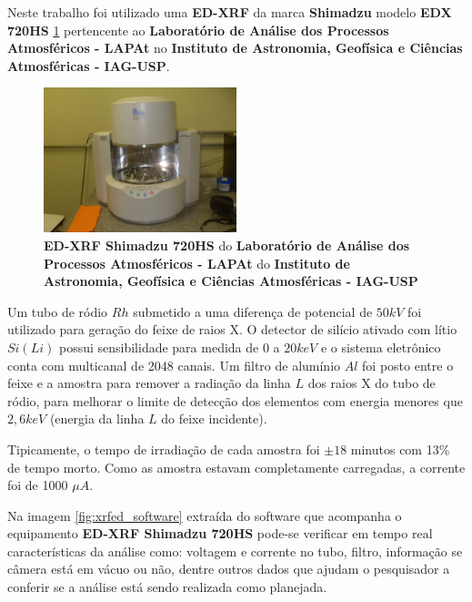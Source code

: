 
Neste trabalho foi utilizado uma \textbf{ED-XRF} da marca \textbf{Shimadzu} 
modelo \textbf{EDX 720HS} \ref{fig:xrfed_iag} pertencente ao 
\textbf{Laboratório de Análise dos Processos Atmosféricos - LAPAt}
no \textbf{Instituto de Astronomia, Geofísica e Ciências Atmosféricas - IAG-USP}.

\begin{figure}[H]
\begin{center}
  \includegraphics[width=0.5\textwidth]{../inputs/images/xrf-ed-IAG-USP.jpg}
  \caption{\textbf{ED-XRF Shimadzu 720HS} do \textbf{Laboratório de Análise dos Processos Atmosféricos - LAPAt} do
           \textbf{Instituto de Astronomia, Geofísica e Ciências Atmosféricas - IAG-USP} \label{fig:xrfed_iag}}
\end{center}
\end{figure}

Um tubo de ródio $Rh$ submetido a uma diferença de potencial 
de $50 kV$ foi utilizado para geração do feixe de raios X.
O detector de silício ativado com lítio $Si(Li)$ possui sensibilidade
para medida de $0$ a $20 keV$ e o sistema eletrônico conta com multicanal 
de 2048 canais.
Um filtro de alumínio $Al$ foi posto entre o feixe e a amostra para remover
a radiação da linha $L$ dos raios X do tubo de ródio, para melhorar o limite
de detecção dos elementos com energia menores que $2,6 keV$ (energia da linha
$L$ do feixe incidente).

Tipicamente, o tempo de irradiação de cada amostra foi $\pm 18$ minutos com 
13\% de tempo morto. Como as amostra estavam completamente carregadas, 
a corrente foi de 1000 $\mu A$. 

Na imagem \ref{fig:xrfed_software} extraída do software que acompanha o equipamento
\textbf{ED-XRF Shimadzu 720HS} pode-se verificar em tempo real características da
análise como: voltagem e corrente no tubo, filtro, informação se câmera está 
em vácuo ou não, dentre outros dados que ajudam o pesquisador a conferir se 
a análise está sendo realizada como planejada. 

